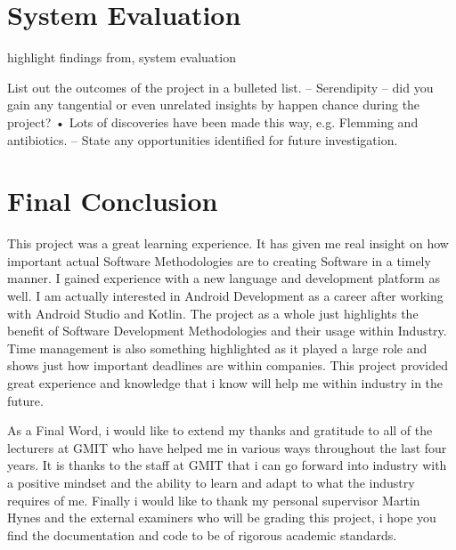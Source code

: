 \bigskip

\section{System Evaluation}
highlight findings from, system evaluation

List out the outcomes of the project in a bulleted list.
– Serendipity – did you gain any tangential or even unrelated insights
by happen chance during the project?
• Lots of discoveries have been made this way, e.g. Flemming
and antibiotics.
– State any opportunities identified for future investigation.
\bigskip

\section{Final Conclusion}
This project was a great learning experience. It has given me real insight on how important actual Software Methodologies are to creating Software in a timely manner. I gained experience with a new language and development platform as well. I am actually interested in Android Development as a career after working with Android Studio and Kotlin. The project as a whole just highlights the benefit of Software Development Methodologies and their usage within Industry. Time management is also something highlighted as it played a large role and shows just how important deadlines are within companies. This project provided great experience and knowledge that i know will help me within industry in the future.\newline

As a Final Word, i would like to extend my thanks and gratitude to all of the lecturers at GMIT who have helped me in various ways throughout the last four years. It is thanks to the staff at GMIT that i can go forward into industry with a positive mindset and the ability to learn and adapt to what the industry requires of me. Finally i would like to thank my personal supervisor Martin Hynes and the external examiners who will be grading this project, i hope you find the documentation and code to be of rigorous academic standards.
\bigskip